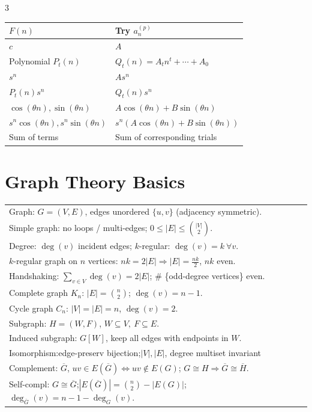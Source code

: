 \documentclass[10pt]{article}
\begin{document}
\begin{multicols*}{3}
\vspace{-1pt}
\begin{center}
\begin{tabular}{@{}p{}@{\hspace{0.02\columnwidth}}p{}@{}}
\toprule
$F(n)$ & Try $a_n^{(p)}$\\
\midrule
$c$ & $A$\\
Polynomial $P_t(n)$ & $Q_t(n)=A_tn^t+\cdots+A_0$\\
$s^n$ & $As^n$\\
$P_t(n)s^n$ & $Q_t(n)s^n$\\
$\cos(\theta n),\sin(\theta n)$ & $A\cos(\theta n)+B\sin(\theta n)$\\
$s^n\cos(\theta n),s^n\sin(\theta n)$ & $s^n(A\cos(\theta n)+B\sin(\theta n))$\\
Sum of terms & Sum of corresponding trials\\
\bottomrule
\end{tabular}
\end{center}

\section*{Graph Theory Basics}
\vspace{-2pt}
\begin{tabular}{@{}p{}@{}}
Graph: $G=(V,E)$, edges unordered $\{u,v\}$ (adjacency symmetric).\\
Simple graph: no loops / multi-edges; $0\le |E|\le \binom{|V|}{2}$.\\
Degree: $\deg(v)$ incident edges; $k$-regular: $\deg(v)=k\ \forall v$.\\
\vspace{-6pt}
$k$-regular graph on $n$ vertices: $nk\!=\!2|E|\Rightarrow|E|\!=\!\frac{nk}{2}$, $nk$ even.\\
\vspace{-6pt}
Handshaking: $\sum_{v\in V}\deg(v)=2|E|$; \# \{odd-degree vertices\} even.\\
Complete graph $K_n$: $|E|=\binom{n}{2}$; $\deg(v)=n-1$.\\
Cycle graph $C_n$: $|V|=|E|=n$, $\deg(v)=2$.\\
Subgraph: $H=(W,F)$, $W\subseteq V,\ F\subseteq E$.\\
Induced subgraph: $G[W]$, keep all edges with endpoints in $W$.\\
Isomorphism:edge-preserv bijection;$|V|,|E|$, degree multiset invariant\\
Complement: $\overline G$, $uv\in E(\overline G)\iff uv\notin E(G)$; $G\!\cong\!H\Rightarrow \overline G\!\cong\!\overline H$.\\
Self-compl: $G\cong\overline G$;$|E(\overline G)|\!=\!\binom{n}{2}\!-\!|E(G)|$; $\deg_{\overline G}(v)\!=\!n\!-\!1\!-\!\deg_G(v)$.\\
\end{tabular}

\end{multicols*}
\end{document}

